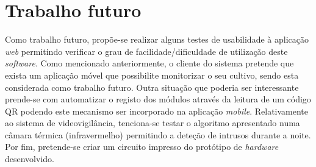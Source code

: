


\section{Trabalho futuro}



Como trabalho futuro, propõe-se realizar alguns testes de usabilidade à aplicação \textit{web} permitindo verificar o grau de facilidade/dificuldade de utilização deste \textit{software}.  Como mencionado anteriormente, o cliente do sistema pretende que exista um aplicação móvel que possibilite monitorizar o seu cultivo, sendo esta considerada como trabalho futuro. Outra situação que poderia ser interessante prende-se com automatizar o registo dos módulos através da leitura de um código \ac{QR} podendo este mecanismo ser incorporado na aplicação \textit{mobile}. Relativamente ao sistema de videovigilância, tenciona-se testar o algoritmo apresentado numa câmara térmica (infravermelho) permitindo a deteção de intrusos durante a noite. Por fim, pretende-se criar um circuito impresso do protótipo de \textit{hardware} desenvolvido. 











 
